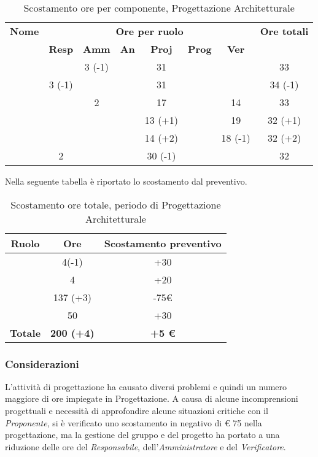 \begin{table}[H]
	\begin{center}
		\begin{tabular}{|c|c|c|c|c|c|c|c|}
			\hline
			\textbf{Nome} & \multicolumn{6}{c|}{\textbf{Ore per ruolo}} & \textbf{Ore totali} \\\cline{2-7}
			& \textbf{Resp} & \textbf{Amm} & \textbf{An} & \textbf{Proj} & \textbf{Prog} & \textbf{Ver} & \\
			\hline
			\MC			&		&	3 (-1)	&		&	31		&		&		&   33	\\
			\hline
			\AN			&3 (-1)	&			&		&	31		&		&		& 	34 (-1)	\\
			\hline
			\DAN		&		&	2		&		&	17		&		&	14	&	33	\\
			\hline
			\AS			&		&		 	&	 	&	13 (+1)	&	 	& 	19	&	32 (+1)	\\
			\hline
			\NS 		&		&			&		&	14 (+2)	&		& 	18 (-1)	&	32 (+2)	\\
			\hline
			\DS			& 	2	&			&		&	30 (-1)	&		&		&	32	\\
			\hline
		\end{tabular}
	\end{center}
	\caption{Scostamento ore per componente, Progettazione Architetturale}
\end{table}

Nella seguente tabella è riportato lo scostamento dal preventivo.

\begin{table}[H]
	\begin{center}
		\begin{tabular}{|c|c|c|}
			\hline
			\textbf{Ruolo}	& \textbf{Ore}	& \textbf{Scostamento preventivo} \\
			\hline
			\Res	&	4(-1)	&	+30	\\
			\hline
			\Amm	&	4	&	+20	\\
			\hline
			\Prog   &	137 (+3)  &	-75€	\\
			\hline
			\Ver	&	50	&	+30 \\
			\hline
			\textbf{Totale} & \textbf{200 (+4)} & \textbf{+5 €}\\
			\hline
		\end{tabular}
	\end{center}
	\caption{Scostamento ore totale, periodo di Progettazione Architetturale}
\end{table}

\subsubsection{Considerazioni}
L'attività di progettazione ha causato diversi problemi e quindi un numero maggiore di ore impiegate in Progettazione. A causa di alcune incomprensioni progettuali e necessità di approfondire alcune situazioni critiche con il \textit{Proponente}, si è verificato uno scostamento in negativo di € 75 nella progettazione, ma la gestione del gruppo e del progetto ha portato a una riduzione delle ore del \textit{Responsabile}, dell'\textit{Amministratore} e del \textit{Verificatore}. 

